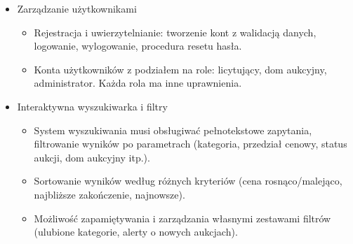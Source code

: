 \begin{itemize}
\begin{itemize}
          \end{itemize}
    \item Zarządzanie użytkownikami
          \begin{itemize}
              \item Rejestracja i uwierzytelnianie: tworzenie kont z walidacją danych, logowanie, wylogowanie, procedura resetu hasła.
              \item Konta użytkowników z podziałem na role: licytujący, dom aukcyjny, administrator. Każda rola ma inne uprawnienia.
          \end{itemize}
    \item Interaktywna wyszukiwarka i filtry
          \begin{itemize}
              \item System wyszukiwania musi obsługiwać pełnotekstowe zapytania, filtrowanie wyników po parametrach (kategoria, przedział cenowy, status aukcji, dom aukcyjny itp.).
              \item Sortowanie wyników według różnych kryteriów (cena rosnąco/maleją\-co, najbliższe zakończenie, najnowsze).
              \item Możliwość zapamiętywania i zarządzania własnymi zestawami filtrów (ulubione kategorie, alerty o nowych aukcjach).
          \end{itemize}
\end{itemize}

